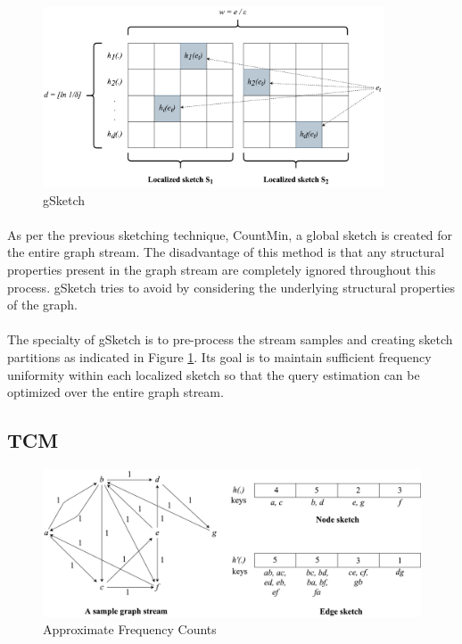 \begin{figure}[H]
    \centering
    \includegraphics[width=0.9\textwidth]{images/gsketch}
    \caption{gSketch}
    \label{figure:gsketch}
\end{figure}

\paragraph{}
As per the previous sketching technique, CountMin\cite{cormode_improved_2003}, a global sketch is created for the entire graph stream. The disadvantage of this method is that any structural properties present in the graph stream are completely ignored throughout this process. gSketch\cite{zhao_gsketch:_2011} tries to avoid by considering the underlying structural properties of the graph. 

\paragraph{}
The specialty of gSketch\cite{zhao_gsketch:_2011} is to pre-process the stream samples and creating sketch partitions as indicated in Figure \ref{figure:gsketch}. Its goal is to maintain sufficient frequency uniformity within each localized sketch so that the query estimation can be optimized over the entire graph stream. 

\subsection{TCM}

\begin{figure}[H]
    \centering
    \includegraphics[width=\textwidth]{images/approximate_frequency_counts}
    \caption{Approximate Frequency Counts}
    \label{figure:afc}
\end{figure}

